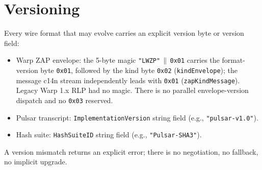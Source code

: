 \documentclass[11pt,a4paper]{article}
\begin{document}
\section{Versioning}

Every wire format that may evolve carries an explicit version byte or version field:

\begin{itemize}[leftmargin=2em,nosep]
  \item Warp ZAP envelope: the 5-byte magic \texttt{"LWZP"}$\,\|\,$\texttt{0x01} carries the format-version byte \texttt{0x01}, followed by the kind byte \texttt{0x02} (\texttt{kindEnvelope}); the message c14n stream independently leads with \texttt{0x01} (\texttt{zapKindMessage}). Legacy Warp 1.x RLP had no magic. There is no parallel envelope-version dispatch and no \texttt{0x03} reserved.
  \item Pulsar transcript: \texttt{ImplementationVersion} string field (e.g., \texttt{"pulsar-v1.0"}).
  \item Hash suite: \texttt{HashSuiteID} string field (e.g., \texttt{"Pulsar-SHA3"}).
\end{itemize}

A version mismatch returns an explicit error; there is no negotiation, no fallback, no implicit upgrade.



\end{document}

